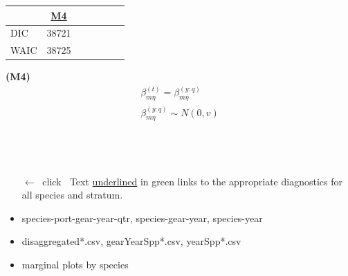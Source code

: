 \documentclass[ xcolor = pdftex, dvipsnames, table ]{beamer}
\begin{document}
%	

%
%

%
\begin{frame}%
\begin{minipage}{0.49\textwidth}
\hspace*{3cm}
\begin{table}[ht!]
        \centering
        \begin{tabular}[c]{@{}lcccccc@{}}
        \hline
        & \href{https://github.com/gasduster99/sppComp/tree/master/sscRuns/25019781982M4}{M4} \\ \hline 
	DIC & 38721 \\
	WAIC & 38725 \\ \hline
        \end{tabular}
\end{table}
\begin{center}
\textbf{(M4)}
\begin{eqnarray*}
&\beta^{(t)}_{m\eta} = \beta^{(y:q)}_{m\eta}&\\
&\beta^{(y:q)}_{m\eta} \sim N(0, v)&\\
&~&
\end{eqnarray*}
\end{center}
\end{minipage}
\begin{minipage}{0.49\textwidth}
$~$\\$~$\\
\hspace*{-3cm}
\begin{itemize}
\item[$\leftarrow~$ click $~$] Text \underline{underlined} in {\color{outlinks}green} links to the appropriate diagnostics for all species and stratum.
\item species-port-gear-year-qtr, species-gear-year, species-year
\item disaggregated*.csv, gearYearSpp*.csv, yearSpp*.csv
\item marginal plots by species
\end{itemize}
\end{minipage}
\end{frame}

%
%
\end{document}
